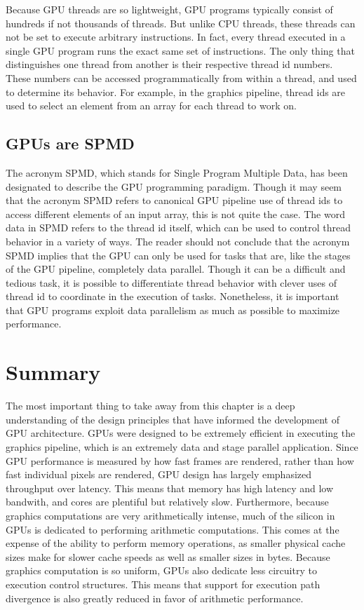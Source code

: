 \documentclass[12pt,twoside]{reedthesis}
\begin{document}
Because GPU threads are so lightweight, GPU programs typically consist of hundreds if not thousands of threads. But unlike CPU threads, these threads can not be set to execute arbitrary instructions. In fact, every thread executed in a single GPU program runs the exact same set of instructions. The only thing that distinguishes one thread from another is their respective thread id numbers. These numbers can be accessed programmatically from within a thread, and used to determine its behavior. For example, in the graphics pipeline, thread ids are used to select an element from an array for each thread to work on.

\subsection{GPUs are SPMD}

The acronym SPMD, which stands for Single Program Multiple Data, has been designated to describe the GPU programming paradigm. Though it may seem that the acronym SPMD refers to canonical GPU pipeline use of thread ids to access different elements of an input array, this is not quite the case. The word data in SPMD refers to the thread id itself, which can be used to control thread behavior in a variety of ways. The reader should not conclude that the acronym SPMD implies that the GPU can only be used for tasks that are, like the stages of the GPU pipeline, completely data parallel. Though it can be a difficult and tedious task, it is possible to differentiate thread behavior with clever uses of thread id to coordinate in the execution of tasks. Nonetheless, it is important that GPU programs exploit data parallelism as much as possible to maximize performance.

\section{Summary}

The most important thing to take away from this chapter is a deep understanding of the design principles that have informed the development of GPU architecture. GPUs were designed to be extremely efficient in executing the graphics pipeline, which is an extremely data and stage parallel application. Since GPU performance is measured by how fast frames are rendered, rather than how fast individual pixels are rendered, GPU design has largely emphasized throughput over latency. This means that memory has high latency and low bandwith, and cores are plentiful but relatively slow. Furthermore, because graphics computations are very arithmetically intense, much of the silicon in GPUs is dedicated to performing arithmetic computations. This comes at the expense of the ability to perform memory operations, as smaller physical cache sizes make for slower cache speeds as well as smaller sizes in bytes. Because graphics computation is so uniform, GPUs also dedicate less circuitry to execution control structures. This means that support for execution path divergence is also greatly reduced in favor of arithmetic performance.
\end{document}

